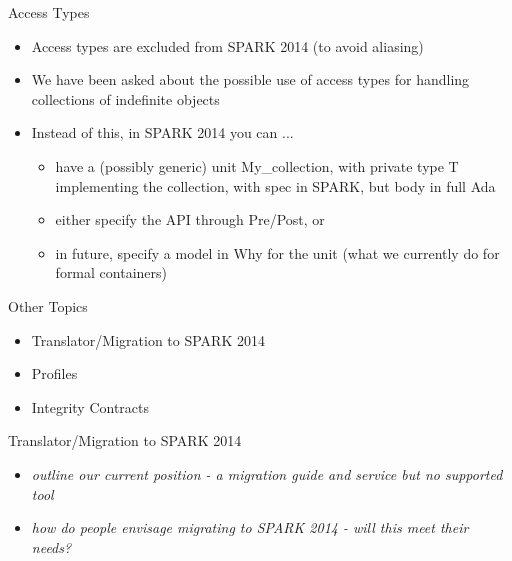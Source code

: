 \documentclass{beamer}
\begin{document}
\begin{frame}{Access Types}

  \begin{itemize}
  \item Access types are excluded from SPARK 2014 (to avoid aliasing)
  \item We have been asked about the possible use of access types for handling collections of indefinite objects
  \item Instead of this, in SPARK 2014 you can ...

    \begin{itemize}
    \item have a (possibly generic) unit My\_collection, with private type T implementing the collection, with spec in SPARK, but body in full Ada
    \item either specify the API through Pre/Post, or
    \item in future, specify a model in Why for the unit (what we currently
      do for formal containers)
    \end{itemize}

  \end{itemize}

\end{frame}

\begin{frame}{Other Topics}

  \begin{itemize}

  \item Translator/Migration to SPARK 2014
  \item Profiles
  \item Integrity Contracts

  \end{itemize}

\end{frame}

\begin{frame}{Translator/Migration to SPARK 2014}

  \begin{itemize}

  \item \emph{outline our current position - a migration guide and service but no supported tool}
  \item \emph{how do people envisage migrating to SPARK 2014 - will this meet their needs?}

  \end{itemize}

\end{frame}
\end{document}
